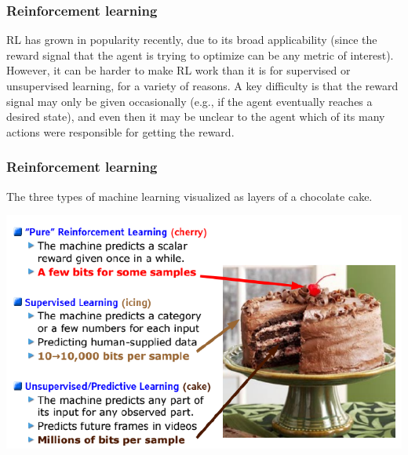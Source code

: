 \documentclass[spanish]{beamer}
\begin{document}
\begin{frame}
\frametitle{Reinforcement learning}
RL has grown in popularity recently, due to its broad applicability (since the reward signal that
the agent is trying to optimize can be any metric of interest). However, it can be harder to make RL
work than it is for supervised or unsupervised learning, for a variety of reasons. A key difficulty is
that the reward signal may only be given occasionally (e.g., if the agent eventually reaches a desired
state), and even then it may be unclear to the agent which of its many actions were responsible for
getting the reward.
\end{frame}
\begin{frame}
\frametitle{Reinforcement learning}
The three types of machine learning visualized as layers of a chocolate cake.
\begin{center}
\includegraphics[scale=0.4]{im16}
\end{center}

\end{frame}
\end{document}
